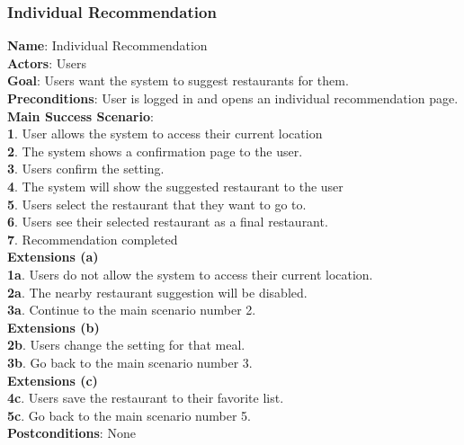 \documentclass[12pt,oneside,openright,a4paper]{cpe-english-project}
\begin{document}
\subsubsection{Individual Recommendation}
\textbf{Name}: Individual Recommendation\\
\textbf{Actors}: Users\\
\textbf{Goal}: Users want the system to suggest restaurants for them.\\
\textbf{Preconditions}: User is logged in and opens an individual recommendation page.\\
\textbf{Main Success Scenario}: \\
\textbf{1}. User allows the system to access their current location\\
\textbf{2}. The system shows a confirmation page to the user.\\
\textbf{3}. Users confirm the setting.\\
\textbf{4}. The system will show the suggested restaurant to the user\\
\textbf{5}. Users select the restaurant that they want to go to.\\
\textbf{6}. Users see their selected restaurant as a final restaurant.\\
\textbf{7}. Recommendation completed\\
\textbf{Extensions (a)} \\
\textbf{1a}. Users do not allow the system to access their current location.\\
\textbf{2a}. The nearby restaurant suggestion will be disabled.\\
\textbf{3a}. Continue to the main scenario number 2.\\
\textbf{Extensions (b)} \\
\textbf{2b}. Users change the setting for that meal.\\
\textbf{3b}. Go back to the main scenario number 3.\\
\textbf{Extensions (c)} \\
\textbf{4c}. Users save the restaurant to their favorite list.\\
\textbf{5c}. Go back to the main scenario number 5.\\
\textbf{Postconditions}: None
\end{document}
